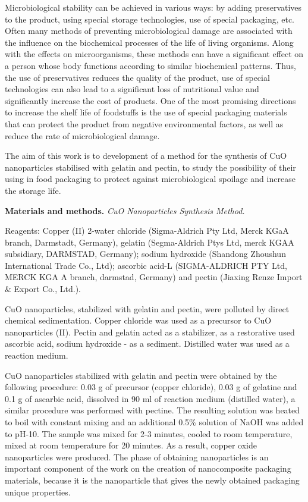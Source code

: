 \begin{multicols}{2}
Microbiological stability can be achieved in various ways: by adding
preservatives to the product, using special storage technologies, use of
special packaging, etc. Often many methods of preventing microbiological
damage are associated with the influence on the biochemical processes of
the life of living organisms. Along with the effects on microorganisms,
these methods can have a significant effect on a person whose body
functions according to similar biochemical patterns. Thus, the use of
preservatives reduces the quality of the product, use of special
technologies can also lead to a significant loss of nutritional value
and significantly increase the cost of products. One of the most
promising directions to increase the shelf life of foodstuffs is the use
of special packaging materials that can protect the product from
negative environmental factors, as well as reduce the rate of
microbiological damage.

The aim of this work is to development of a method for the synthesis of
CuO nanoparticles stabilised with gelatin and pectin, to study the
possibility of their using in food packaging to protect against
microbiological spoilage and increase the storage life.

{\bfseries Materials and methods.} \emph{CuO Nanoparticles Synthesis
Method.}

Reagents: Copper (II) 2-water chloride (Sigma-Aldrich Pty Ltd, Merck
KGaA branch, Darmstadt, Germany), gelatin (Segma-Aldrich Ptys Ltd, merck
KGAA subsidiary, DARMSTAD, Germany); sodium hydroxide (Shandong Zhoushun
International Trade Co., Ltd); ascorbic acid-L (SIGMA-ALDRICH PTY Ltd,
MERCK KGA A branch, darmstad, Germany) and pectin (Jiaxing Renze Import
\& Export Co., Ltd.).

CuO nanoparticles, stabilized with gelatin and pectin, were polluted by
direct chemical sedimentation. Copper chloride was used as a precursor
to CuO nanoparticles (II). Pectin and gelatin acted as a stabilizer, as
a restorative used ascorbic acid, sodium hydroxide - as a sediment.
Distilled water was used as a reaction medium.

CuO nanoparticles stabilized with gelatin and pectin were obtained by
the following procedure: 0.03 g of precursor (copper chloride), 0.03 g
of gelatine and 0.1 g of ascarbic acid, dissolved in 90 ml of reaction
medium (distilled water), a similar procedure was performed with
pectine. The resulting solution was heated to boil with constant mixing
and an additional 0.5\% solution of NaOH was added to pH-10. The sample
was mixed for 2-3 minutes, cooled to room temperature, mixed at room
temperature for 20 minutes. As a result, copper oxide nanoparticles were
produced. The phase of obtaining nanoparticles is an important component
of the work on the creation of nanocomposite packaging materials,
because it is the nanoparticle that gives the newly obtained packaging
unique properties.


\end{multicols}
